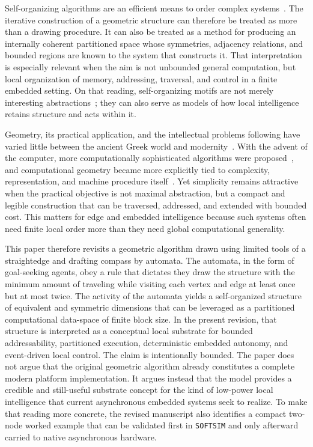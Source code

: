 \documentclass[11pt]{article}
\begin{document}
Self-organizing algorithms are an efficient means to order complex
systems~\cite{ashby1957,simula1999,guerin2004}. The iterative construction of a
geometric structure can therefore be treated as more than a drawing procedure.
It can also be treated as a method for producing an internally coherent
partitioned space whose symmetries, adjacency relations, and bounded regions
are known to the system that constructs it. That interpretation is especially
relevant when the aim is not unbounded general computation, but local
organization of memory, addressing, traversal, and control in a finite
embedded setting. On that reading, self-organizing motifs are not merely
interesting abstractions~\cite{pattee1995}; they can also serve as models of
how local intelligence retains structure and acts within it.

Geometry, its practical application, and the intellectual problems following
have varied little between the ancient Greek world and modernity~\cite{netz1999}.
With the advent of the computer, more computationally sophisticated algorithms
were proposed~\cite{graham1972}, and computational geometry became more
explicitly tied to complexity, representation, and machine procedure
itself~\cite{toussaint1992,shamos1975}. Yet simplicity remains attractive when
the practical objective is not maximal abstraction, but a compact and legible
construction that can be traversed, addressed, and extended with bounded cost.
This matters for edge and embedded intelligence because such systems often need
finite local order more than they need global computational generality.

This paper therefore revisits a geometric algorithm drawn using limited tools
of a straightedge and drafting compass by automata. The automata, in the form
of goal-seeking agents, obey a rule that dictates they draw the structure with
the minimum amount of traveling while visiting each vertex and edge at least
once but at most twice. The activity of the automata yields a self-organized
structure of equivalent and symmetric dimensions that can be leveraged as a
partitioned computational data-space of finite block size. In the present
revision, that structure is interpreted as a conceptual local substrate for
bounded addressability, partitioned execution, deterministic embedded
autonomy, and event-driven local control. The claim is intentionally bounded.
The paper does not argue that the original geometric algorithm already
constitutes a complete modern platform implementation. It argues instead that
the model provides a credible and still-useful substrate concept for the kind
of low-power local intelligence that current asynchronous embedded systems seek
to realize. To make that reading more concrete, the revised manuscript also
identifies a compact two-node worked example that can be validated first in
\texttt{SOFTSIM} and only afterward carried to native asynchronous hardware.
\end{document}
